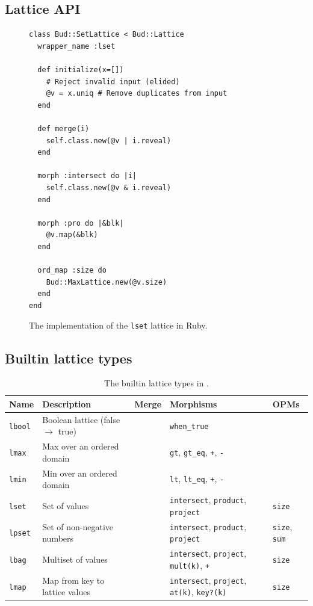 \subsection{Lattice API}
\label{sec:lattice-api}

\begin{figure}[t]
\begin{scriptsize}
\begin{lstlisting}
class Bud::SetLattice < Bud::Lattice
  wrapper_name :lset

  def initialize(x=[])
    # Reject invalid input (elided)
    @v = x.uniq # Remove duplicates from input
  end

  def merge(i)
    self.class.new(@v | i.reveal)
  end

  morph :intersect do |i|
    self.class.new(@v & i.reveal)
  end

  morph :pro do |&blk|
    @v.map(&blk)
  end

  ord_map :size do
    Bud::MaxLattice.new(@v.size)
  end
end
\end{lstlisting}
\end{scriptsize}
\caption{The implementation of the \texttt{lset} lattice in Ruby.}
\label{fig:lattice-set}
\end{figure}

\subsection{Builtin lattice types}
\label{sec:lattice-builtins}

\begin{table}[t]
\begin{tabular}{|l|l|l|l|l|}
\hline
\textbf{Name} & \textbf{Description} & \textbf{Merge} & \textbf{Morphisms} & \textbf{OPMs}\\
\hline
\texttt{lbool} & Boolean lattice (false $\to$ true) & & \texttt{when\_true} & \\
\texttt{lmax} & Max over an ordered domain & &\texttt{gt},
\texttt{gt\_eq}, \texttt{+}, \texttt{-} & \\
\texttt{lmin} & Min over an ordered domain & &\texttt{lt}, \texttt{lt\_eq},
\texttt{+}, \texttt{-} & \\
\texttt{lset} & Set of values & & \texttt{intersect}, \texttt{product},
\texttt{project} & \texttt{size} \\
\texttt{lpset} & Set of non-negative numbers & &
\texttt{intersect}, \texttt{product}, \texttt{project}& \texttt{size}, \texttt{sum} \\
\texttt{lbag} & Multiset of values & & \texttt{intersect},
\texttt{project}, \texttt{mult(k)}, \texttt{+} & \texttt{size}\\
\texttt{lmap} & Map from key to lattice values & &
\texttt{intersect}, \texttt{project}, \texttt{at(k)}, \texttt{key?(k)} & \texttt{size}\\
\hline
\end{tabular}
\caption{The builtin lattice types in \lang.}
\label{tbl:builtin-lattices}
\end{table}

